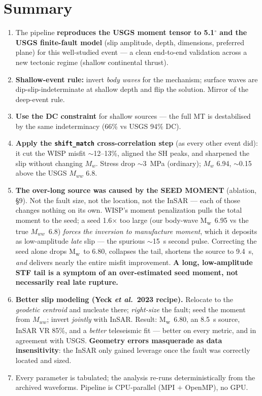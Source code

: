 \documentclass[11pt]{article}
\newcommand{\Mw}{M\textsubscript{w}}
\begin{document}
\section{Summary}
\begin{enumerate}
\item The pipeline \textbf{reproduces the USGS moment tensor to 5.1$^\circ$ and the USGS
finite-fault model} (slip amplitude, depth, dimensions, preferred plane) for this well-studied
event --- a clean end-to-end validation across a new tectonic regime (shallow continental thrust).
\item \textbf{Shallow-event rule:} invert \emph{body waves} for the mechanism; surface waves are
dip-slip-indeterminate at shallow depth and flip the solution. Mirror of the deep-event rule.
\item \textbf{Use the DC constraint} for shallow sources --- the full MT is destabilised by the
same indeterminacy (66\% vs USGS 94\% DC).
\item \textbf{Apply the \texttt{shift\_match} cross-correlation step} (as every other event did):
it cut the WISP misfit $\sim$12--13\%, aligned the SH peaks, and sharpened the slip without changing
$M_w$. Stress drop $\sim$3~MPa (ordinary); $M_w$ 6.94, $\sim$0.15 above the USGS $M_{ww}$ 6.8.
\item \textbf{The over-long source was caused by the SEED MOMENT} (ablation, \S9). Not the fault
size, not the location, not the InSAR --- each of those changes nothing on its own. WISP's moment
penalization pulls the total moment to the seed; a seed 1.6$\times$ too large (our body-wave \Mw~6.95
vs the true $M_{ww}$~6.8) \emph{forces the inversion to manufacture moment}, which it deposits as
low-amplitude \emph{late} slip --- the spurious $\sim$15~s second pulse. Correcting the seed alone
drops \Mw\ to 6.80, collapses the tail, shortens the source to 9.4~s, \emph{and} delivers nearly the
entire misfit improvement. \textbf{A long, low-amplitude STF tail is a symptom of an over-estimated
seed moment, not necessarily real late rupture.}
\item \textbf{Better slip modeling (Yeck \emph{et al.}\ 2023 recipe).} Relocate to the
\emph{geodetic centroid} and nucleate there; \emph{right-size} the fault; seed the moment from
$M_{ww}$; invert \emph{jointly} with InSAR. Result: \Mw~6.80, an 8.5~s source, InSAR VR 85\%, and a
\emph{better} teleseismic fit --- better on every metric, and in agreement with USGS.
\textbf{Geometry errors masquerade as data insensitivity}: the InSAR only gained leverage once the
fault was correctly located and sized.
\item Every parameter is tabulated; the analysis re-runs deterministically from the archived
waveforms. Pipeline is CPU-parallel (MPI $+$ OpenMP), no GPU.
\end{enumerate}
\end{document}
